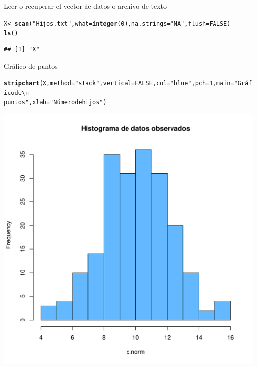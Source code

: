 \documentclass[10pt,a4paper]{article}\usepackage[]{graphicx}\usepackage[]{color}
\makeatletter
\def\maxwidth{ %
  \ifdim\Gin@nat@width>\linewidth
    \linewidth
  \else
    \Gin@nat@width
  \fi
}
\newcommand{\hlnum}[1]{\textcolor[rgb]{0.686,0.059,0.569}{#1}}%
\newcommand{\hlstr}[1]{\textcolor[rgb]{0.192,0.494,0.8}{#1}}%
\newcommand{\hlstd}[1]{\textcolor[rgb]{0.345,0.345,0.345}{#1}}%
\newcommand{\hlkwb}[1]{\textcolor[rgb]{0.69,0.353,0.396}{#1}}%
\newcommand{\hlkwc}[1]{\textcolor[rgb]{0.333,0.667,0.333}{#1}}%
\newcommand{\hlkwd}[1]{\textcolor[rgb]{0.737,0.353,0.396}{\textbf{#1}}}%
\newenvironment{kframe}{%
 \def\at@end@of@kframe{}%
 \ifinner\ifhmode%
  \def\at@end@of@kframe{\end{minipage}}%
  \begin{minipage}{\columnwidth}%
 \fi\fi%
 \def\FrameCommand##1{\hskip\@totalleftmargin \hskip-\fboxsep
 \colorbox{shadecolor}{##1}\hskip-\fboxsep
     \hskip-\linewidth \hskip-\@totalleftmargin \hskip\columnwidth}%
 \MakeFramed {\advance\hsize-\width
   \@totalleftmargin\z@ \linewidth\hsize
   \@setminipage}}%
 {\par\unskip\endMakeFramed%
 \at@end@of@kframe}
\newenvironment{knitrout}{}{} %
\makeatother
\begin{document}
Leer o recuperar el vector de datos o archivo de texto
\begin{knitrout}
\color{fgcolor}\begin{kframe}
\begin{alltt}
\hlstd{X} \hlkwb{<-} \hlkwd{scan}\hlstd{(}\hlstr{"Hijos.txt"}\hlstd{,} \hlkwc{what} \hlstd{=} \hlkwd{integer}\hlstd{(}\hlnum{0}\hlstd{),} \hlkwc{na.strings} \hlstd{=} \hlstr{"NA"}\hlstd{,} \hlkwc{flush}\hlstd{=}\hlnum{FALSE}\hlstd{)}
\hlkwd{ls}\hlstd{()}
\end{alltt}
\begin{verbatim}
## [1] "X"
\end{verbatim}
\end{kframe}
\end{knitrout}


Gráfico de puntos
\begin{knitrout}
\color{fgcolor}\begin{kframe}
\begin{alltt}
\hlkwd{stripchart}\hlstd{(X,} \hlkwc{method}\hlstd{=}\hlstr{"stack"}\hlstd{,} \hlkwc{vertical}\hlstd{=}\hlnum{FALSE}\hlstd{,} \hlkwc{col}\hlstd{=}\hlstr{"blue"}\hlstd{,} \hlkwc{pch}\hlstd{=}\hlnum{1}\hlstd{,} \hlkwc{main}\hlstd{=}\hlstr{"Gráfico de\textbackslash{}n
puntos"}\hlstd{,} \hlkwc{xlab}\hlstd{=}\hlstr{"Número de hijos"}\hlstd{)}
\end{alltt}
\end{kframe}
\includegraphics[width=\maxwidth]{figure/unnamed-chunk-5-1} 

\end{knitrout}
\end{document}

